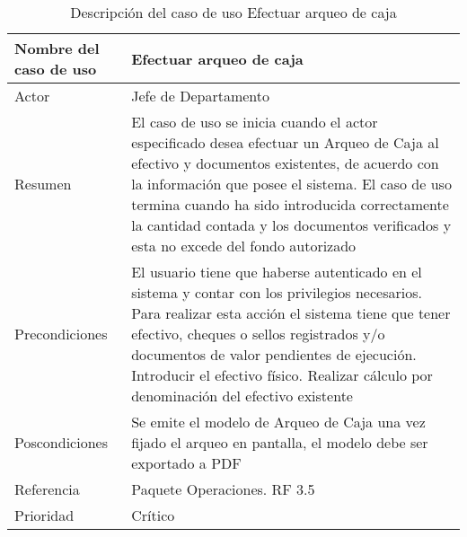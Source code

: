 \begin{table}[H]
	\sf
	\begin{supertabular}{|p{4.5cm}|p{12cm}|}
		\hline
		\textbf{Nombre del caso de uso}
		& \textbf{Efectuar arqueo de caja} \\ \hline
		
		Actor
		& Jefe de Departamento \\ \hline
		
		Resumen
		& El caso de uso se inicia cuando el actor especificado desea efectuar un Arqueo de Caja al efectivo y documentos existentes, de acuerdo con la información que posee el sistema. El caso de uso termina cuando ha sido introducida correctamente la cantidad contada y los documentos verificados y esta no excede del fondo autorizado \\ \hline
		
		Precondiciones
		& El usuario tiene que haberse autenticado en el sistema y contar con los privilegios necesarios. Para realizar esta acción el sistema tiene que tener efectivo, cheques o sellos registrados y/o documentos de valor pendientes de ejecución. Introducir el efectivo físico. Realizar cálculo por denominación del efectivo existente \\ \hline
		
		Poscondiciones
		& Se emite el modelo de Arqueo de Caja una vez fijado el arqueo en pantalla, el modelo debe ser exportado a PDF \\ \hline
		
		Referencia
		& Paquete Operaciones. RF 3.5 \\ \hline
		
		Prioridad
		& Crítico \\		
		\hline
	\end{supertabular}
	\caption[Descripción del caso de uso Efectuar arqueo de caja]{Descripción del caso de uso Efectuar arqueo de caja}
	\label{table:CU_EfArqCaja}
\end{table}

